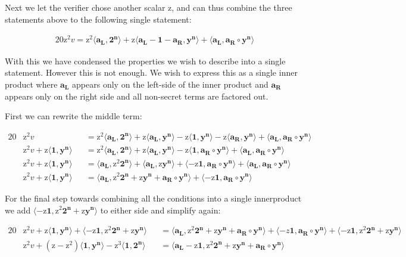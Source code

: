 \documentclass{article}
\newcommand{\eq}[1]{\begin{alignat*}{20}#1\end{alignat*}}
\renewcommand{\vec}[1]{\boldsymbol{#1}}
\newcommand{\ran}[1]{\mathrm{#1}}
\newcommand{\vecran}[1]{\mathbf{#1}}
\newcommand{\dotp}[2]{\langle #1, #2 \rangle}
\begin{document}
Next we let the verifier chose another scalar $\ran{z}$, and can thus combine the three statements above to the following single statement: 

\eq{
	\ran{z^2}v = 
	\ran{z^2}\dotp{\vec{a_L}}{\vec{2^n}} +
	\ran{z}\dotp{\vec{a_L} - \vec{1} - \vec{a_R}}{\vecran{y^n}} +
	\dotp{\vec{a_L}}{\vec{a_R}\circ \vecran{y^n}}
}

With this we have condensed the properties we wish to describe into a single statement. However this is not enough. We wish to express this as a single inner product where $\vec{a_L}$ appears only on the left-side of the inner product and $\vec{a_R}$ appears only on the right side and all non-secret terms are factored out. 

First we can rewrite the middle term:

\eq{	
	&\ran{z^2}v &&= 
	\ran{z^2}\dotp{\vec{a_L}}{\vec{2^n}} +
	\ran{z}\dotp{\vec{a_L}}{\vecran{y^n}} -
	\ran{z}\dotp{\vec{1}}{\vecran{y^n}} -
	\ran{z}\dotp{\vec{a_R}}{\vecran{y^n}} +
	\dotp{\vec{a_L}}{\vec{a_R}\circ \vecran{y^n}} \\
	&\ran{z^2}v + \ran{z}\dotp{\vec{1}}{\vecran{y^n}} 
	&&= \ran{z^2}\dotp{\vec{a_L}}{\vec{2^n}} +
	\ran{z}\dotp{\vec{a_L}}{\vecran{y^n}} -
	\ran{z}\dotp{\vec{1}}{\vec{a_R}\circ\vecran{y^n}} +
	\dotp{\vec{a_L}}{\vec{a_R}\circ \vecran{y^n}} \\
	&\ran{z^2}v + \ran{z}\dotp{\vec{1}}{\vecran{y^n}} 
	&&= \dotp{\vec{a_L}}{\ran{z^2}\vec{2^n}} +
	\dotp{\vec{a_L}}{\ran{z}\vecran{y^n}} +
	\dotp{-\ran{z}\vec{1}}{\vec{a_R}\circ\vecran{y^n}} +
	\dotp{\vec{a_L}}{\vec{a_R}\circ \vecran{y^n}} \\
	&\ran{z^2}v + \ran{z}\dotp{\vec{1}}{\vecran{y^n}} 
	&&= \dotp{\vec{a_L}}{\ran{z^2}\vec{2^n} + \ran{z}\vecran{y^n} + \vec{a_R}\circ \vecran{y^n}} +
	\dotp{-\ran{z}\vec{1}}{\vec{a_R}\circ\vecran{y^n}}
}

For the final step towards combining all the conditions into a single innerproduct we add $\dotp{-\ran{z}\vec{1}}{\ran{z^2}\vec{2^n} + \ran{z}\vecran{y^n}}$ to either side and simplify again:

\eq{
	&\ran{z^2}v + \ran{z}\dotp{\vec{1}}{\vecran{y^n}} + \dotp{-\ran{z}\vec{1}}{\ran{z^2}\vec{2^n} + \ran{z}\vecran{y^n}}
	&&= \dotp{\vec{a_L}}{\ran{z^2}\vec{2^n} + \ran{z}\vecran{y^n} + \vec{a_R}\circ \vecran{y^n}} +
	\dotp{-z\vec{1}}{\vec{a_R}\circ\vecran{y^n}} + \dotp{-\ran{z}\vec{1}}{\ran{z^2}\vec{2^n} + \ran{z}\vecran{y^n}} \\
	&\ran{z^2}v + (\ran{z} - \ran{z^2})\dotp{\vec{1}}{\vecran{y^n}} - \ran{z^3}\dotp{\vec{1}}{\vec{2^n}} &&= \dotp{\vec{a_L}- \ran{z}\vec{1}}{\ran{z^2}\vec{2^n} + \ran{z}\vecran{y^n} + \vec{a_R}\circ \vecran{y^n}}
}
\end{document}
